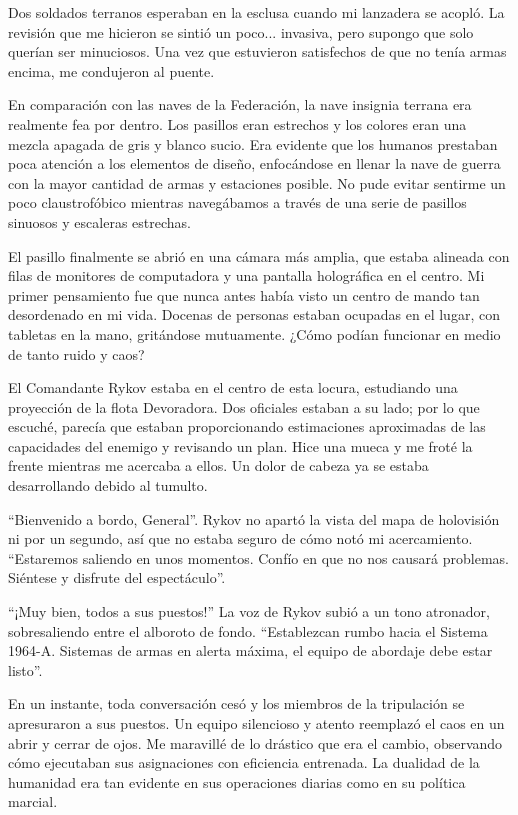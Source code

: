 \documentclass[spanish,12pt,a4paper,oneside,titlepage]{book}
\begin{document}
    Dos soldados terranos esperaban en la esclusa cuando mi lanzadera se acopló. La revisión que me hicieron se sintió un poco... invasiva, pero supongo que solo querían ser minuciosos. Una vez que estuvieron satisfechos de que no tenía armas encima, me condujeron al puente.

    En comparación con las naves de la Federación, la nave insignia terrana era realmente fea por dentro. Los pasillos eran estrechos y los colores eran una mezcla apagada de gris y blanco sucio. Era evidente que los humanos prestaban poca atención a los elementos de diseño, enfocándose en llenar la nave de guerra con la mayor cantidad de armas y estaciones posible. No pude evitar sentirme un poco claustrofóbico mientras navegábamos a través de una serie de pasillos sinuosos y escaleras estrechas.

    El pasillo finalmente se abrió en una cámara más amplia, que estaba alineada con filas de monitores de computadora y una pantalla holográfica en el centro. Mi primer pensamiento fue que nunca antes había visto un centro de mando tan desordenado en mi vida. Docenas de personas estaban ocupadas en el lugar, con tabletas en la mano, gritándose mutuamente. ¿Cómo podían funcionar en medio de tanto ruido y caos?

    El Comandante Rykov estaba en el centro de esta locura, estudiando una proyección de la flota Devoradora. Dos oficiales estaban a su lado; por lo que escuché, parecía que estaban proporcionando estimaciones aproximadas de las capacidades del enemigo y revisando un plan. Hice una mueca y me froté la frente mientras me acercaba a ellos. Un dolor de cabeza ya se estaba desarrollando debido al tumulto.

    “Bienvenido a bordo, General”. Rykov no apartó la vista del mapa de holovisión ni por un segundo, así que no estaba seguro de cómo notó mi acercamiento. ``Estaremos saliendo en unos momentos. Confío en que no nos causará problemas. Siéntese y disfrute del espectáculo''.

    ``¡Muy bien, todos a sus puestos!'' La voz de Rykov subió a un tono atronador, sobresaliendo entre el alboroto de fondo. ``Establezcan rumbo hacia el Sistema 1964-A. Sistemas de armas en alerta máxima, el equipo de abordaje debe estar listo''.

    En un instante, toda conversación cesó y los miembros de la tripulación se apresuraron a sus puestos. Un equipo silencioso y atento reemplazó el caos en un abrir y cerrar de ojos. Me maravillé de lo drástico que era el cambio, observando cómo ejecutaban sus asignaciones con eficiencia entrenada. La dualidad de la humanidad era tan evidente en sus operaciones diarias como en su política marcial.
\end{document}

